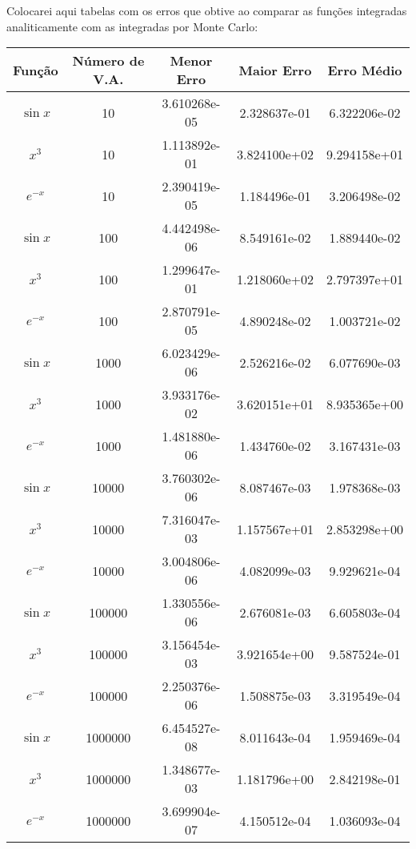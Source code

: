 \documentclass[12pt]{article}
\begin{document}
Colocarei aqui tabelas com os erros que obtive ao comparar as funções integradas analiticamente com as integradas por Monte Carlo:

\begin{center}
  \begin{tabular}{||c | c | c | c | c ||}
    \hline
    Função & Número de V.A. & Menor Erro & Maior Erro & Erro Médio \\ [0.5ex]
    \hline\hline
    $\sin{x}$ & 10 & 3.610268e-05 & 2.328637e-01 & 6.322206e-02 \\
    \hline
    $x^3$ & 10 & 1.113892e-01 & 3.824100e+02 & 9.294158e+01 \\
    \hline
    $e^{-x}$ & 10 & 2.390419e-05 & 1.184496e-01 & 3.206498e-02 \\
    \hline
    $\sin{x}$ & 100 & 4.442498e-06 & 8.549161e-02 & 1.889440e-02 \\
    \hline
    $x^3$ & 100 & 1.299647e-01 & 1.218060e+02 & 2.797397e+01 \\
    \hline
    $e^{-x}$ & 100 & 2.870791e-05 & 4.890248e-02 & 1.003721e-02 \\
    \hline
    $\sin{x}$ & 1000 & 6.023429e-06 & 2.526216e-02 & 6.077690e-03 \\
    \hline
    $x^3$ & 1000 & 3.933176e-02 & 3.620151e+01 & 8.935365e+00 \\
    \hline
    $e^{-x}$ & 1000 & 1.481880e-06 & 1.434760e-02 & 3.167431e-03 \\
    \hline
    $\sin{x}$ & 10000 & 3.760302e-06 & 8.087467e-03 & 1.978368e-03 \\
    \hline
    $x^3$ & 10000 & 7.316047e-03 & 1.157567e+01 & 2.853298e+00 \\
    \hline
    $e^{-x}$ & 10000 & 3.004806e-06 & 4.082099e-03 & 9.929621e-04 \\
    \hline
    $\sin{x}$ & 100000 & 1.330556e-06 & 2.676081e-03 & 6.605803e-04 \\
    \hline
    $x^3$ & 100000 & 3.156454e-03 & 3.921654e+00 & 9.587524e-01 \\
    \hline
    $e^{-x}$ & 100000 & 2.250376e-06 & 1.508875e-03 & 3.319549e-04 \\
    \hline
    $\sin{x}$ & 1000000 & 6.454527e-08 & 8.011643e-04 & 1.959469e-04 \\
    \hline
    $x^3$ & 1000000 & 1.348677e-03 & 1.181796e+00 & 2.842198e-01 \\
    \hline
    $e^{-x}$ & 1000000 & 3.699904e-07 & 4.150512e-04 & 1.036093e-04 \\
    \hline
  \end{tabular}
\end{center}
\end{document}
